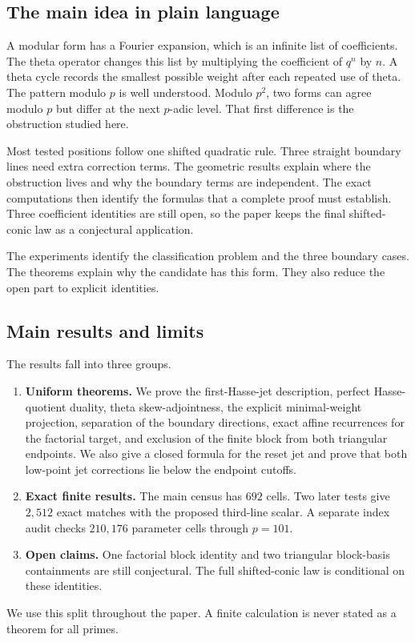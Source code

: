 \documentclass[11pt]{article}
\theoremstyle{remark}
\begin{document}
\subsection{The main idea in plain language}

A modular form has a Fourier expansion, which is an infinite list of
coefficients.  The theta operator changes this list by multiplying the
coefficient of $q^n$ by $n$.  A theta cycle records the smallest possible
weight after each repeated use of theta.  The pattern modulo $p$ is well
understood.  Modulo $p^2$, two forms can agree modulo $p$ but differ at the
next $p$-adic level.  That first difference is the obstruction studied here.

Most tested positions follow one shifted quadratic rule.  Three straight
boundary lines need extra correction terms.  The geometric results explain
where the obstruction lives and why the boundary terms are independent.  The
exact computations then identify the formulas that a complete proof must
establish.  Three coefficient identities are still open, so the paper keeps
the final shifted-conic law as a conjectural application.

The experiments identify the classification problem and the three boundary
cases.  The theorems explain why the candidate has this form.  They also
reduce the open part to explicit identities.

\subsection{Main results and limits}

The results fall into three groups.
\begin{enumerate}
\item \textbf{Uniform theorems.}  We prove the first-Hasse-jet description,
      perfect Hasse-quotient duality, theta skew-adjointness, the explicit
      minimal-weight projection, separation of the boundary directions,
      exact affine recurrences for the factorial target, and exclusion of
      the finite block from both triangular endpoints.  We also give a
      closed formula for the reset jet and prove that both low-point jet
      corrections lie below the endpoint cutoffs.
\item \textbf{Exact finite results.}  The main census has $692$ cells.  Two
      later tests give $2{,}512$ exact matches with the proposed third-line
      scalar.  A separate index audit checks $210{,}176$ parameter cells
      through $p=101$.
\item \textbf{Open claims.}  One factorial block identity and two triangular
      block-basis containments are still conjectural.  The full
      shifted-conic law is conditional on these identities.
\end{enumerate}
We use this split throughout the paper.  A finite calculation is never stated
as a theorem for all primes.
\end{document}
